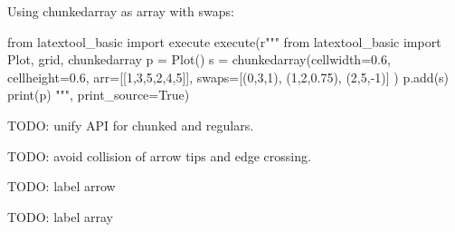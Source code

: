 Using chunkedarray as array with swaps:
\begin{python}
from latextool_basic import execute
execute(r"""
from latextool_basic import Plot, grid, chunkedarray
p = Plot()
s = chunkedarray(cellwidth=0.6,
                 cellheight=0.6,
                 arr=[[1,3,5,2,4,5]],
                 swaps=[(0,3,1), (1,2,0.75), (2,5,-1)]
)
p.add(s)
print(p)
""", print_source=True)
\end{python}


TODO: unify API for chunked and regulars.

TODO: avoid collision of arrow tips and edge crossing.

TODO: label arrow

TODO: label array
